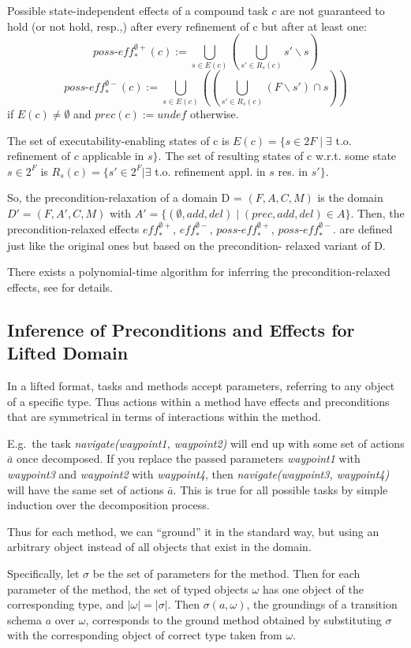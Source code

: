 \documentclass[letterpaper]{article} %
\newcommand{\RelEffPlus} {\ensuremath{\mathit{eff^{\emptyset +}_{*}}}}
\newcommand{\RelEffMinus} {\ensuremath{\mathit{eff^{\emptyset -}_{*}}}}
\newcommand{\RelPossEffPlus} {\ensuremath{\mathit{\textit{poss-eff}^{\emptyset +}_{*}}}}
\newcommand{\RelPossEffMinus} {\ensuremath{\mathit{\textit{poss-eff}^{\emptyset -}_{*}}}}
\begin{document}
Possible state-independent effects of a compound task $c$ are not guaranteed to hold (or not hold, resp.,)
after every refinement of c but after at least one:
$$ \RelPossEffPlus(c) := \bigcup_{s \in E(c)}  ( \bigcup_{s' \in R_s(c)}  s' \backslash s) $$
$$ \RelPossEffMinus(c) := \bigcup_{s \in E(c)} ((\bigcup_{s' \in R_s(c)} (F \backslash s') \cap s ))$$
if $E(c) \neq \emptyset$ and $prec(c) := undef$ otherwise.


The set of executability-enabling states of c is
$E(c) = \{s \in 2F  \mid  \exists$ t.o. refinement of $c$ applicable in $s \}$.
The set of resulting states of c w.r.t. some state $s \in 2^F$ is
$R_s(c) = \{s' \in 2^F | \exists$ t.o. refinement appl. in $s$ res. in $s' \}$.

So, the precondition-relaxation of a domain D = $(F, A, C, M)$ is the domain $D' = (F, A', C, M)$
with $A' = \{(\emptyset, add , del ) \mid (prec, add , del ) \in A\}$.
Then, the precondition-relaxed effects $\RelEffPlus$, $\RelEffMinus$, $\RelPossEffPlus$, $\RelPossEffMinus$. are defined just like the original ones but based on the precondition-
relaxed variant of D.

There exists a polynomial-time algorithm for inferring the precondition-relaxed effects, see \cite{ConnyPreEstimation} for details.

\subsection{Inference of Preconditions and Effects for Lifted Domain}
In a lifted format, tasks and methods accept parameters, referring to any object of a specific type. Thus actions within a method have effects and preconditions that are symmetrical in terms of interactions within the method. 

E.g.\ the task \textit{navigate(waypoint1, waypoint2)} will end up with some set of actions  $\bar{a}$ once decomposed. If you replace the passed parameters \textit{waypoint1} with \textit{waypoint3} and \textit{waypoint2} with \textit{waypoint4}, then \textit{navigate(waypoint3, waypoint4)} will have the same set of actions $\bar{a}$. This is true for all possible tasks by simple induction over the decomposition process.

Thus for each method, we can \enquote{ground} it in the standard way, but using an arbitrary object instead of all objects that exist in the domain.

Specifically, let $\sigma$ be the set of parameters for the method. Then for each parameter of the method, the set of typed objects $\omega$ has one object of the corresponding type, and $|\omega| = |\sigma|$. Then $\sigma(a, \omega)$, the groundings of a transition schema $a$ over $\omega$, corresponds to the ground method obtained by substituting $\sigma$ with the corresponding object of correct type taken from $\omega$.
\end{document}
